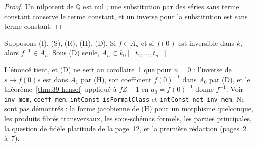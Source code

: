 \begin{proof}
Un nilpotent de $\mathbb Q$ est nul ; une substitution par des séries sans terme constant conserve le terme constant, et un inverse pour la substitution est sans terme constant.
\end{proof}

\begin{encadre}
\begin{theoreme}
Supposons (I), (S), (R), (H), (D). Si $f \in A_n$ et si $f(0)$ est inversible dans $k$, alors $f^{-1} \in A_n$. Sous (D) seule, $A_n \subset k_0[[t_1, \ldots, t_n]]$.
\end{theoreme}
\end{encadre}

\noindent L'énoncé tient, et (D) ne sert au corollaire~1 que pour $n = 0$ : l'inverse de $s \mapsto f(0)s$ est dans $A_1$ par (H), son coefficient $f(0)^{-1}$ dans $A_0$ par (D), et le théorème~\ref{thm:39-hensel} appliqué à $fZ - 1$ en $a_0 = f(0)^{-1}$ donne $f^{-1}$. Voir \texttt{inv\_mem}, \texttt{coeff\_mem}, \texttt{intConst\_isFormalClass} et \texttt{intConst\_not\_inv\_mem}. Ne sont pas démontrés : la forme jacobienne de (H) pour un morphisme quelconque, les produits fibrés transversaux, les sous-schémas formels, les parties principales, la question de fidèle platitude de la page~12, et la première rédaction (pages~2 à~7).
